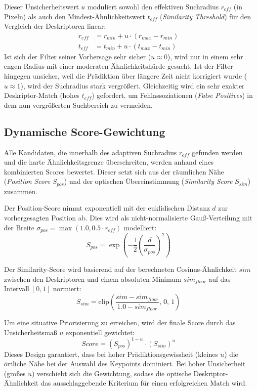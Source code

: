 Dieser Unsicherheitswert $u$ moduliert sowohl den effektiven Suchradius $r_{eff}$ (in Pixeln) als auch den Mindest-Ähnlichkeitswert $t_{eff}$ (\textit{Similarity Threshold}) für den Vergleich der Deskriptoren linear:
\begin{align}
    r_{eff} &= r_{min} + u \cdot (r_{max} - r_{min}) \\
    t_{eff} &= t_{min} + u \cdot (t_{max} - t_{min})
\end{align}
Ist sich der Filter seiner Vorhersage sehr sicher ($u \approx 0$), wird nur in einem sehr engen Radius mit einer moderaten Ähnlichkeitshürde gesucht. Ist der Filter hingegen unsicher, weil die Prädiktion über längere Zeit nicht korrigiert wurde ($u \approx 1$), wird der Suchradius stark vergrößert. Gleichzeitig wird ein sehr exakter Deskriptor-Match (hohes $t_{eff}$) gefordert, um Fehlassoziationen (\textit{False Positives}) in dem nun vergrößerten Suchbereich zu vermeiden.

\subsection{Dynamische Score-Gewichtung}
Alle Kandidaten, die innerhalb des adaptiven Suchradius $r_{eff}$ gefunden werden und die harte Ähnlichkeitsgrenze überschreiten, werden anhand eines kombinierten Scores bewertet. Dieser setzt sich aus der räumlichen Nähe (\textit{Position Score} $S_{pos}$) und der optischen Übereinstimmung (\textit{Similarity Score} $S_{sim}$) zusammen.

Der Position-Score nimmt exponentiell mit der euklidischen Distanz $d$ zur vorhergesagten Position ab. Dies wird als nicht-normalisierte Gauß-Verteilung mit der Breite $\sigma_{pos} = \max(1.0, 0.5 \cdot r_{eff})$ modelliert:
\begin{equation}
    S_{pos} = \exp\left(-\frac{1}{2}\left(\frac{d}{\sigma_{pos}}\right)^2\right)
\end{equation}

Der Similarity-Score wird basierend auf der berechneten Cosinus-Ähnlichkeit $sim$ zwischen den Deskriptoren und einem absoluten Minimum $sim_{floor}$ auf das Intervall $[0, 1]$ normiert:
\begin{equation}
    S_{sim} = \text{clip}\left(\frac{sim - sim_{floor}}{1.0 - sim_{floor}}, \, 0, \, 1\right)
\end{equation}

Um eine situative Priorisierung zu erreichen, wird der finale Score durch das Unsicherheitsmaß $u$ exponentiell gewichtet:
\begin{equation}
    Score = \left(S_{pos}\right)^{1-u} \cdot \left(S_{sim}\right)^u
\end{equation}
Dieses Design garantiert, dass bei hoher Prädiktionsgewissheit (kleines $u$) die örtliche Nähe bei der Auswahl des Keypoints dominiert. Bei hoher Unsicherheit (großes $u$) verschiebt sich die Gewichtung, sodass die optische Deskriptor-Ähnlichkeit das ausschlaggebende Kriterium für einen erfolgreichen Match wird.

